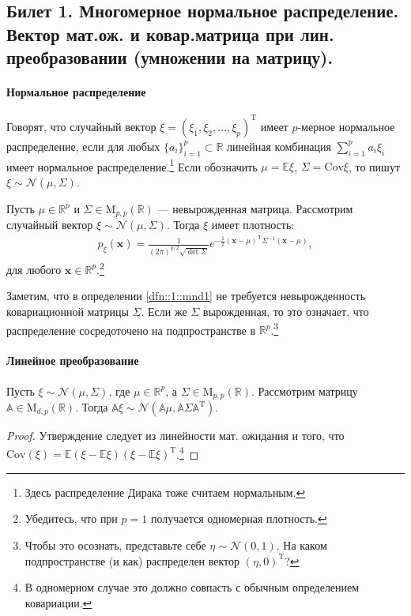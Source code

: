 \subsection{Билет 1. Многомерное нормальное распределение. Вектор мат.ож. и ковар.матрица при лин. преобразовании (умножении на матрицу).}
\paragraph{Нормальное распределение}
\begin{dfn}
    \label{dfn::1::mnd1}
    Говорят, что случайный вектор $\mathbb \xi = (\xi_1, \xi_2, \ldots, \xi_p)^\mathrm T$ имеет $p$-мерное нормальное распределение, если %
    для любых $\{a_i\}_{i=1}^p \subset \mathbb R$ линейная комбинация $\sum_{i=1}^p a_i \xi_i$ имеет 
    нормальное распределение.\footnote{Здесь распределение Дирака тоже считаем нормальным.}
    Если обозначить $\mu = \mathbb E \xi$, $\Sigma = \mathrm{Cov} \xi$, то пишут $\xi \sim \mathcal N(\mu, \Sigma)$.
\end{dfn}
\begin{thm}
    \label{thm::1::mnd2}
    Пусть $\mu \in \mathbb R^p$ и $\Sigma \in \mathrm M_{p, p}(\mathbb R)$ --- невырожденная матрица.
    Рассмотрим случайный вектор $\mathbb \xi \sim \mathcal N(\mu, \Sigma)$.
    Тогда $\mathbb \xi$ имеет плотность:
    \begin{gather}
        \label{mnd_dens}
        p_\mathbb \xi (\mathbf x) = \frac{1}{(2 \pi)^{p/2} \sqrt{\det \Sigma}}
        e^{-\frac{1}{2} (\mathbf{x} - \mu)^\mathrm T \Sigma^{-1} (\mathbf x - \mu)},
    \end{gather}
    для любого $\mathbf x \in \mathbb R^p$.\footnote{Убедитесь, что при $p = 1$ получается одномерная плотность.}
\end{thm}

Заметим, что в определении \ref{dfn::1::mnd1} не требуется невырожденность ковариационной матрицы $\Sigma$.
Если же $\Sigma$ вырожденная, то это означает, что распределение сосредоточено на подпространстве в $\mathbb R^p$.\footnote{Чтобы
    это осознать, представьте себе $\eta \sim \mathcal N(0, 1)$. На каком подпространстве (и как) распределен вектор $(\eta, 0)^\mathrm T$?
}
\paragraph{Линейное преобразование}
\begin{thm}
Пусть $\xi \sim \mathcal N(\mu, \Sigma)$, где $\mu \in \mathbb R^p$, а $\Sigma \in \mathrm M_{p,p}(\mathbb R)$. Рассмотрим матрицу $\mathbb A \in \mathrm M_{d,p}(\mathbb R)$.
    Тогда $\mathbb A \xi \sim \mathcal N\left(\mathbb A \mu, \mathbb A \Sigma \mathbb A^\mathrm T\right)$.  \end{thm}
\begin{proof}
    Утверждение следует из линейности мат. ожидания и того, что $\mathrm{Cov}(\xi) = \mathbb E(\xi-\mathbb E\xi)(\xi-\mathbb E\xi)^\mathrm T$.\footnote{В
    одномерном случае это должно совпасть с обычным определением ковариации.}
\end{proof}

